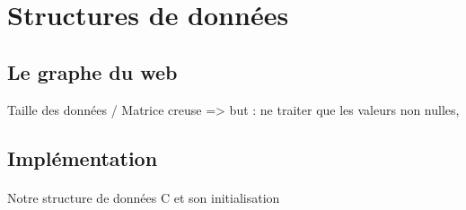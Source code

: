 \section{Structures de données}

	\subsection{Le graphe du web}
		
		Taille des données / Matrice creuse => but : ne traiter que les valeurs non nulles, 
		\paragraph{}
		
	\subsection{Implémentation}
		
		\paragraph{}Notre structure de données C et son initialisation
